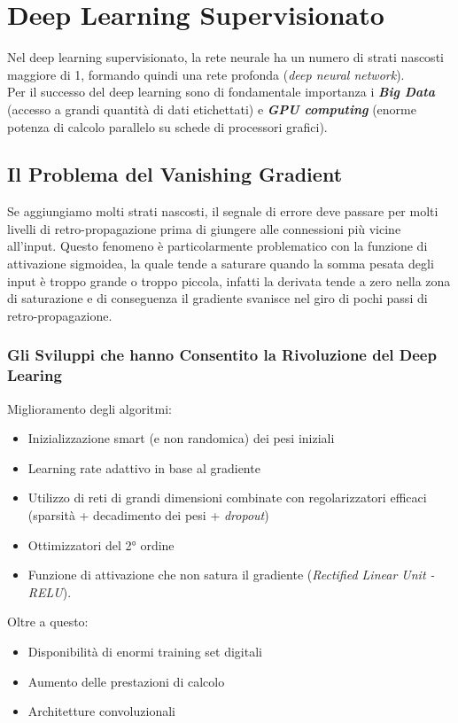 \documentclass[12pt, a4paper]{article}
\begin{document}
\newpage
\section{Deep Learning Supervisionato}
Nel deep learning supervisionato, la rete neurale ha un numero di strati nascosti maggiore di 1, formando quindi una rete profonda (\textit{deep neural network}).\\
Per il successo del deep learning sono di fondamentale importanza i \textbf{\textit{Big Data}} (accesso a grandi quantità di dati etichettati) e \textbf{\textit{GPU computing}} (enorme potenza di calcolo parallelo su schede di processori grafici).
\subsection{Il Problema del Vanishing Gradient}
Se aggiungiamo molti strati nascosti, il segnale di errore deve passare per molti livelli di retro-propagazione prima di giungere alle connessioni più vicine all'input. Questo fenomeno è particolarmente problematico con la funzione di attivazione sigmoidea, la quale tende a saturare quando la somma pesata degli input è troppo grande o troppo piccola, infatti la derivata tende a zero nella zona di saturazione e di conseguenza il gradiente svanisce nel giro di pochi passi di retro-propagazione.
\subsubsection{Gli Sviluppi che hanno Consentito la Rivoluzione del Deep Learing}
Miglioramento degli algoritmi:
\begin{itemize}
    \item Inizializzazione smart (e non randomica) dei pesi iniziali
    \item Learning rate adattivo in base al gradiente
    \item Utilizzo di reti di grandi dimensioni combinate con regolarizzatori efficaci (sparsità + decadimento dei pesi + \textit{dropout})
    \item Ottimizzatori del 2° ordine
    \item Funzione di attivazione che non satura il gradiente (\textit{Rectified Linear Unit - RELU}).
\end{itemize}

Oltre a questo:
\begin{itemize}
    \item Disponibilità di enormi training set digitali
    \item Aumento delle prestazioni di calcolo
    \item Architetture convoluzionali
\end{itemize}
\end{document}
